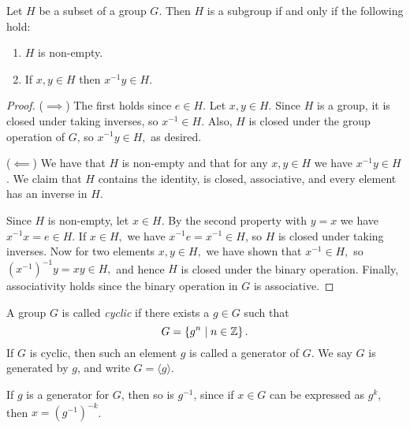\begin{proposition}
  Let $H$ be a subset of a group $G$. Then $H$ is a subgroup if and only if the following hold:
  \begin{enumerate}
    \item $H$ is non-empty.
    \item If $x,y\in H$ then $x^{-1}y\in H$.
  \end{enumerate}
  \label{subgroupTest}
\end{proposition}
\begin{proof}
  ($\implies$) The first holds since $e\in H$. Let $x,y \in H.$ Since $H$ is a group, it is closed under taking inverses, so $x^{-1}\in H$. Also, $H$ is closed under the group operation of $G$, so $x^{-1}y\in H,$ as desired.

    ($\impliedby$) We have that $H$ is non-empty and that for any $x,y\in H$ we have $x^{-1}y\in H$. We claim that $H$ contains the identity, is closed, associative, and every element has an inverse in $H$. 

  Since $H$ is non-empty, let $x\in H.$
  By the second property with $y=x$ we have $x^{-1}x=e\in H.$
  If $x\in H,$ we have $x^{-1}e=x^{-1}\in H$, so $H$ is closed under taking inverses. Now for two elements $x,y \in H,$ we have shown that $x^{-1} \in H,$ so  $(x^{-1})^{-1}y=xy\in H,$ and hence $H$ is closed under the binary operation. Finally, associativity holds since the binary operation in $G$ is associative.
\end{proof}

\begin{definition}
  A group $G$ is called \emph{cyclic} if there exists a $g\in G$ such that $$G=\left\{ g^n \mid n\in\mathbb Z
  \right\}.$$ If $G$ is cyclic, then such an element $g$ is called a generator of $G$. We
  say $G$ is generated by $g$, and write $G=\langle g \rangle$.
  \label{cyclicGroup}
\end{definition}

\begin{remark}
    If $g$ is a generator for $G$, then so is $g^{-1}$, since if $x\in G$ can be expressed as $g^k$, then $x = (g^{-1})^{-k}$.
\end{remark}

